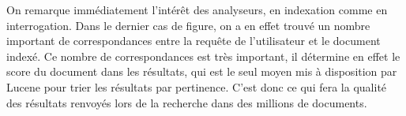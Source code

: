 On remarque immédiatement l’intérêt des analyseurs, en indexation comme en interrogation. Dans le dernier cas de figure, on a en effet trouvé un nombre important de correspondances entre la requête de l’utilisateur et le document indexé. Ce nombre de correspondances est très important, il détermine en effet le score du document dans les résultats, qui est le seul moyen mis à disposition par Lucene pour trier les résultats par pertinence. C’est donc ce qui fera la qualité des résultats renvoyés lors de la recherche dans des millions de documents.





